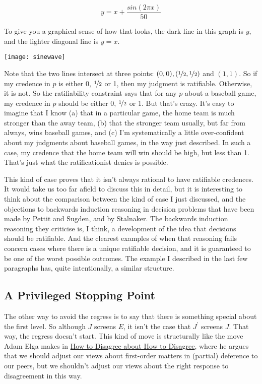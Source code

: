\begin{equation}
y = x + \frac{sin(2\pi x)}{50}
\end{equation}

\noindent To give you a graphical sense of how that looks, the dark line in this graph is \(y\), and the lighter diagonal line is \(y = x\).

\begin{center}
\texttt{[image: sinewave]}
\end{center}

\noindent Note that the two lines intersect at three points: \((0, 0), (\nicefrac{1}{2}, \nicefrac{1}{2})\) and \((1, 1)\). So if my credence in \(p\) is either 0, \(\nicefrac{1}{2}\) or 1, then my judgment is ratifiable. Otherwise, it is not. So the ratifiability constraint says that for any \(p\) about a baseball game, my credence in \(p\) should be either 0, \(\nicefrac{1}{2}\) or 1. But that's crazy. It's easy to imagine that I know (a) that in a particular game, the home team is much stronger than the away team, (b) that the stronger team usually, but far from always, wins baseball games, and (c) I'm systematically a little over-confident about my judgments about baseball games, in the way just described. In such a case, my credence that the home team will win should be high, but less than 1. That's just what the ratificationist denies is possible.

This kind of case proves that it isn't always rational to have ratifiable credences. It would take us too far afield to discuss this in detail, but it is interesting to think about the comparison between the kind of case I just discussed, and the objections to backwards induction reasoning in decision problems that have been made by Pettit and Sugden, and by Stalnaker. The backwards induction reasoning they criticise is, I think, a development of the idea that decisions should be ratifiable. And the clearest examples of when that reasoning fails concern cases where there is a unique ratifiable decision, and it is guaranteed to be one of the worst possible outcomes. The example I described in the last few paragraphs has, quite intentionally, a similar structure.

\subsection{A Privileged Stopping Point}

The other way to avoid the regress is to say that there is something special about the first level. So although \(J\) screens \(E\), it isn't the case that \(J^\prime\) screens \(J\). That way, the regress doesn't start. This kind of move is structurally like the move Adam Elga makes in \href{http://philsci-archive.pitt.edu/archive/00003702/}{How to Disagree about How to Disagree}, where he argues that we should adjust our views about first-order matters in (partial) deference to our peers, but we shouldn't adjust our views about the right response to disagreement in this way.

